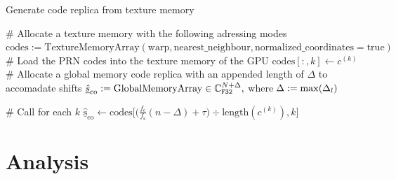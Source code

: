 \documentclass{juliacon}
\begin{document}
\begin{algorithm}
    \caption{\label{alg:gen-code-replica} Generate code replica from texture memory}
    
    \begin{algorithmic}[1]
        \State \# Allocate a texture memory with the following adressing modes
        \vspace{1mm}
        \State $\mathrm{codes} := \mathrm{TextureMemoryArray(warp, nearest\_neighbour, normalized\_coordinates = true)}$
        \vspace{4mm}
        \State \# Load the PRN codes into the texture memory of the GPU
        \vspace{1mm}
            \State $\mathrm{codes}[:, k] \gets c^{(k)}$
        \EndFor
        \vspace{4mm}
        \State \# Allocate a global memory code replica with an appended length of $\Delta$ to accomadate shifts
        \vspace{1mm}
        \State $\underline{ \hat{s} }_{\mathrm{co}} := \mathrm{GlobalMemoryArray} \in \mathbb{C}^{N + \Delta}_{\texttt{F32}}, \hspace{1mm}$where$\hspace{1mm} \Delta := \mathrm{max}(\Delta_l)$
        \vspace{4mm}

        \State \# Call for each $k$
        \vspace{1mm}
        \vspace{1mm}
            \State $\mathrm{\underline{ \hat{s} }_{\mathrm{co}}} \gets \mathrm{codes}\Big[\big(\frac{f_{\mathrm{c}}}{f_{\mathrm{s}} } (n-\Delta) + \tau\big) \div \mathrm{length}(c^{(k)}), k\Big]$
            \vspace{2mm}
        \EndFor

            \vspace{1mm}
        \EndProcedure
    \end{algorithmic}
\end{algorithm}

\section{Analysis}\label{sec:analysis}
\end{document}
